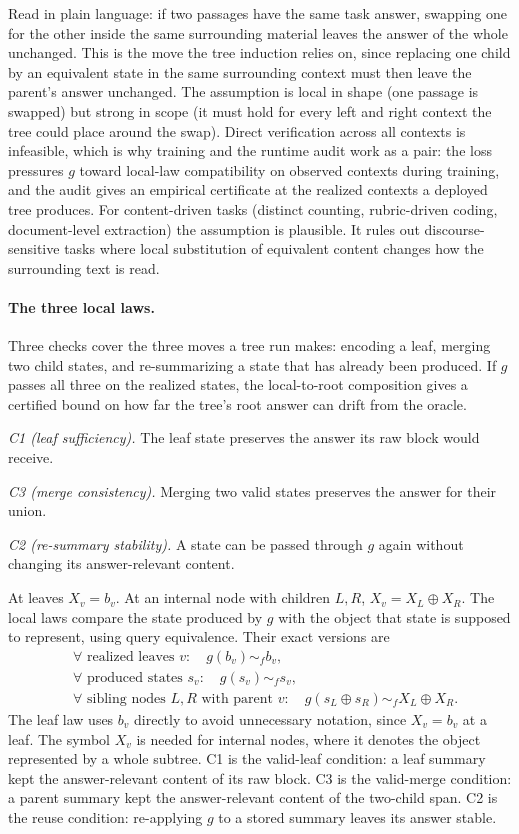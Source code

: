 Read in plain language: if two passages have the same task answer,
swapping one for the other inside the same surrounding material
leaves the answer of the whole unchanged. This is the move the tree
induction relies on, since replacing one child by an equivalent state
in the same surrounding context must then leave the parent's answer
unchanged. The assumption is local in shape (one passage is swapped)
but strong in scope (it must hold for every left and right context
the tree could place around the swap). Direct verification across all
contexts is infeasible, which is why training and the runtime audit
work as a pair: the loss pressures \(g\) toward local-law
compatibility on observed contexts during training, and the audit
gives an empirical certificate at the realized contexts a deployed
tree produces. For
content-driven tasks (distinct counting, rubric-driven coding,
document-level extraction) the assumption is plausible. It rules
out discourse-sensitive tasks where local substitution of
equivalent content changes how the surrounding text is read.

\paragraph{The three local laws.}
Three checks cover the three moves a tree run makes: encoding a leaf,
merging two child states, and re-summarizing a state that has already
been produced. If \(g\) passes all three on the realized states, the
local-to-root composition gives a certified bound on how far the
tree's root answer can drift from the oracle.

\emph{C1 (leaf sufficiency).} The leaf state preserves the answer its
raw block would receive.

\emph{C3 (merge consistency).} Merging two valid states preserves the
answer for their union.

\emph{C2 (re-summary stability).} A state can be passed through \(g\)
again without changing its answer-relevant content.

At leaves \(X_v=b_v\). At an internal node with children \(L,R\),
\(X_v=X_L\oplus X_R\). The local laws compare the state produced by
\(g\) with the object that state is supposed to represent, using query
equivalence. Their exact versions are
\begin{align}
\tag{C1}
&\forall\text{ realized leaves }v:\quad
  g(b_v)\sim_f b_v,\\
\tag{C2}
&\forall\text{ produced states }s_v:\quad g(s_v)\sim_f s_v,\\
\tag{C3}
&\forall\text{ sibling nodes }L,R\text{ with parent }v:\quad
  g(s_L\oplus s_R)\sim_f X_L\oplus X_R.
\end{align}
The leaf law uses \(b_v\) directly to avoid unnecessary notation,
since \(X_v=b_v\) at a leaf. The symbol \(X_v\) is needed for internal
nodes, where it denotes the object represented by a whole subtree. C1
is the valid-leaf condition: a leaf summary kept the answer-relevant
content of its raw block. C3 is the valid-merge condition: a parent
summary kept the answer-relevant content of the two-child span. C2 is
the reuse condition: re-applying \(g\) to a stored summary leaves its
answer stable.

